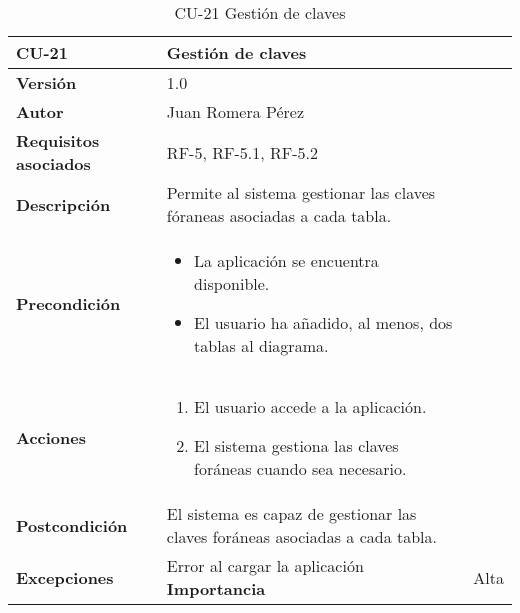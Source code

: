 \begin{table}[p]
    \centering
    \begin{tabularx}{\linewidth}{ p{} p{}}
		\toprule
		\textbf{CU-21}    & \textbf{Gestión de claves}\\
		\toprule
		\textbf{Versión}              & 1.0    \\
		\textbf{Autor}                & Juan Romera Pérez \\
		\textbf{Requisitos asociados} & RF-5, RF-5.1, RF-5.2 \\
		\textbf{Descripción}          & Permite al sistema gestionar las claves fóraneas asociadas a cada tabla. \\
		\textbf{Precondición}         & \begin{itemize}
		    \item La aplicación se encuentra disponible.
            \item El usuario ha añadido, al menos, dos tablas al diagrama.
		\end{itemize} \\
		\textbf{Acciones}             &
		\begin{enumerate}
			\def\labelenumi{\arabic{enumi}.}
			\tightlist
			\item El usuario accede a la aplicación.
            \item El sistema gestiona las claves foráneas cuando sea necesario.
		\end{enumerate}\\
		\textbf{Postcondición}        & El sistema es capaz de gestionar las claves foráneas asociadas a cada tabla. \\
		\textbf{Excepciones}          & Error al cargar la aplicación
		\textbf{Importancia}          & Alta \\
		\bottomrule
    \end{tabularx}
    \caption{CU-21 Gestión de claves}
\end{table}

